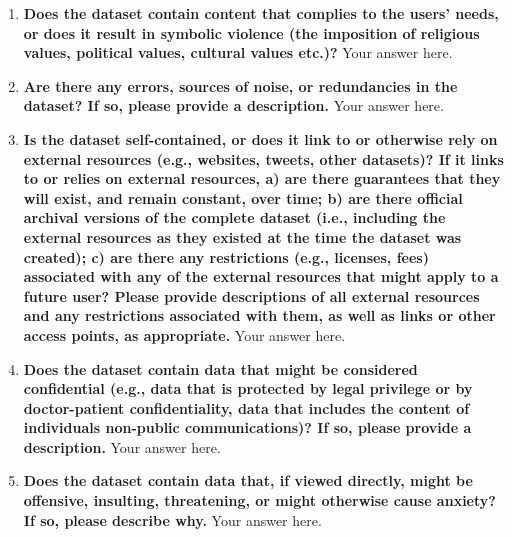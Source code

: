 \documentclass{article}
\begin{document}
\begin{enumerate}[leftmargin=0.65cm]
        \item \textbf{Does the dataset contain content that complies to the users' needs, or does it result in symbolic violence (the imposition of religious values, political values, cultural values etc.)?}
        \newline 
        Your answer here.
        \newline 
        
        \item \textbf{Are there any errors, sources of noise, or redundancies in the dataset? If so, please provide a description.}
        \newline 
        Your answer here.
        \newline 
        
        \item \textbf{Is the dataset self-contained, or does it link to or otherwise rely on external resources (e.g., websites, tweets, other datasets)? If it links to or relies on external resources, a) are there guarantees that they will exist, and remain constant, over time; b) are there official archival versions of the complete dataset (i.e., including the external resources as they existed at the time the dataset was created); c) are there any restrictions (e.g., licenses, fees) associated with any of the external resources that might apply to a future user? Please provide descriptions of all external resources and any restrictions associated with them, as well as links or other access points, as appropriate.}
        \newline 
        Your answer here.
        \newline 
        
        \item \textbf{Does the dataset contain data that might be considered confidential (e.g., data that is protected by legal privilege or by doctor-patient confidentiality, data that includes the content of individuals non-public communications)? If so, please provide a description.}
        \newline 
        Your answer here.
        \newline 
        
        \item \textbf{Does the dataset contain data that, if viewed directly, might be offensive, insulting, threatening, or might otherwise cause anxiety? If so, please describe why.}
        \newline 
        Your answer here.
        \newline 
        

\end{enumerate}
\end{document}
